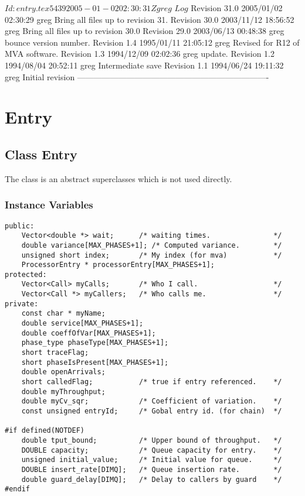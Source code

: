 \C 
\C $Id: entry.tex 5439 2005-01-02 02:30:31Z greg $
\C 
\C $Log$
\C Revision 31.0  2005/01/02 02:30:29  greg
\C Bring all files up to revision 31.
\C
\C Revision 30.0  2003/11/12 18:56:52  greg
\C Bring all files up to revision 30.0
\C
\C Revision 29.0  2003/06/13 00:48:38  greg
\C bounce version number.
\C
\C Revision 1.4  1995/01/11 21:05:12  greg
\C Revised for R12 of MVA software.
\C
\C Revision 1.3  1994/12/09  02:02:36  greg
\C update.
\C
\C Revision 1.2  1994/08/04  20:52:11  greg
\C Intermediate save
\C
\C Revision 1.1  1994/06/24  19:11:32  greg
\C Initial revision
\C
\C ----------------------------------------------------------------------
\section{Entry}
\label{sec:entry}

\htmlrule
\subsection{Class Entry}

The class  is an abstract superclasses which is not used
directly.

\subsubsection{Instance Variables}
\label{sec:entry-ivars}

\begin{verbatim}
public:
    Vector<double *> wait;      /* waiting times.               */
    double variance[MAX_PHASES+1]; /* Computed variance.        */
    unsigned short index;       /* My index (for mva)           */
    ProcessorEntry * processorEntry[MAX_PHASES+1];
protected:
    Vector<Call> myCalls;       /* Who I call.                  */
    Vector<Call *> myCallers;   /* Who calls me.                */
private:
    const char * myName;
    double service[MAX_PHASES+1];
    double coeffOfVar[MAX_PHASES+1];
    phase_type phaseType[MAX_PHASES+1];
    short traceFlag;
    short phaseIsPresent[MAX_PHASES+1];
    double openArrivals;
    short calledFlag;           /* true if entry referenced.    */
    double myThroughput;
    double myCv_sqr;            /* Coefficient of variation.    */
    const unsigned entryId;     /* Gobal entry id. (for chain)  */

#if defined(NOTDEF)
    double tput_bound;          /* Upper bound of throughput.   */
    DOUBLE capacity;            /* Queue capacity for entry.    */
    unsigned initial_value;     /* Initial value for queue.     */
    DOUBLE insert_rate[DIMQ];   /* Queue insertion rate.        */
    double guard_delay[DIMQ];   /* Delay to callers by guard    */
#endif
\end{verbatim}

